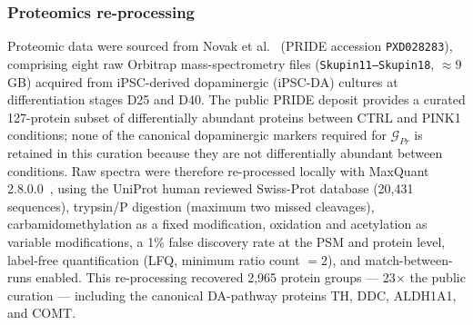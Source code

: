 \documentclass[5p,times,twocolumn]{elsarticle}
\newcommand{\lang}[1]{#1}
\begin{document}
\subsubsection{Proteomics re-processing}
Proteomic data were sourced from Novak et al.~\cite{novak2022single}
(PRIDE accession \texttt{PXD028283}), comprising eight raw
Orbitrap mass-spectrometry files (\texttt{Skupin11--Skupin18},
$\approx 9$\,GB) acquired from iPSC-derived dopaminergic
(iPSC-DA) cultures at differentiation stages D25 and D40.
The public PRIDE deposit provides a curated 127-protein subset
of differentially abundant proteins between CTRL and PINK1
conditions; none of the canonical dopaminergic markers required
for $\mathcal{G}_{Pr}$ \lang{is} retained in this curation because
they are not differentially abundant between conditions.
Raw spectra were therefore re-processed locally with
MaxQuant 2.8.0.0~\cite{cox2008maxquant}, using the UniProt
human reviewed Swiss-Prot database (20,431 sequences),
trypsin/P digestion (maximum two missed cleavages),
carbamidomethylation as a fixed modification, oxidation and
acetylation as variable modifications, a 1\% false discovery
rate at the PSM and protein level, label-free quantification
(LFQ, minimum ratio count $= 2$), and match-between-runs
enabled.
This \lang{re-processing} recovered 2,965 protein groups --- 23$\times$ the
public curation --- including the canonical DA-pathway
proteins TH, DDC, ALDH1A1, and COMT.
\end{document}
